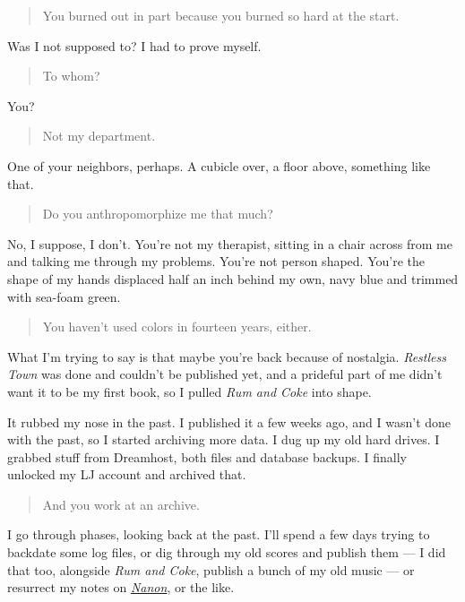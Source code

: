 \begin{quote}
You burned out in part because you burned so hard at the start.
\end{quote}

Was I not supposed to? I had to prove myself.

\begin{quote}
To whom?
\end{quote}

You?

\begin{quote}
Not my department.
\end{quote}

One of your neighbors, perhaps. A cubicle over, a floor above, something like that.

\begin{quote}
Do you anthropomorphize me that much?
\end{quote}

No, I suppose, I don't. You're not my therapist, sitting in a chair across from me and talking me through my problems. You're not person shaped. You're the shape of my hands displaced half an inch behind my own, navy blue and trimmed with sea-foam green.

\begin{quote}
You haven't used colors in fourteen years, either.
\end{quote}

What I'm trying to say is that maybe you're back because of nostalgia. \emph{Restless Town} was done and couldn't be published yet, and a prideful part of me didn't want it to be my first book, so I pulled \emph{Rum and Coke} into shape.

It rubbed my nose in the past. I published it a few weeks ago, and I wasn't done with the past, so I started archiving more data. I dug up my old hard drives. I grabbed stuff from Dreamhost, both files and database backups. I finally unlocked my LJ account and archived that.

\begin{quote}
And you work at an archive.
\end{quote}

I go through phases, looking back at the past. I'll spend a few days trying to backdate some log files, or dig through my old scores and publish them --- I did that too, alongside \emph{Rum and Coke}, publish a bunch of my old music --- or resurrect my notes on \href{http://nanon.lang.drab-makyo.com}{\emph{Nanon}}, or the like.

